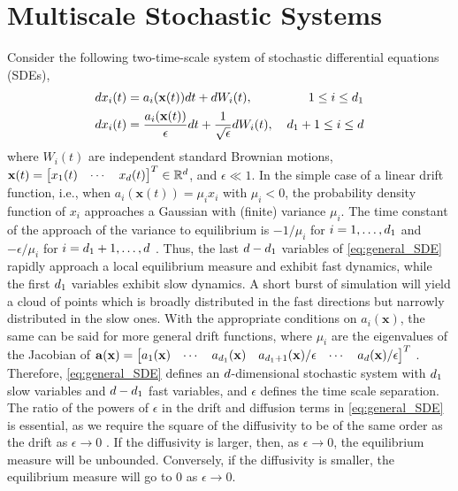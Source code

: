 \section{Multiscale Stochastic Systems} \label{subsec:multiscale_SDE}

Consider the following two-time-scale system of stochastic differential equations (SDEs),
\begin{equation} \label{eq:general_SDE}
\begin{aligned}
dx_i(t) &= a_i(\mathbf{x}(t)) dt + dW_i(t), & \: 1 \le i \le {d_1} \\
dx_i(t) &= \frac{a_i(\mathbf{x}(t))}{\epsilon} dt + \frac{1}{\sqrt{\epsilon}} dW_i(t) , & \: {d_1}+1 \le i \le d
\end{aligned}
\end{equation}
where $W_i(t)$ are independent standard Brownian motions, $\mathbf{x}(t)  =  \allowbreak \begin{bmatrix} x_1(t) & \cdots & x_d(t) \end{bmatrix}^T \allowbreak \in \mathbb{R}^d$, and $\epsilon \ll 1$.
%
In the simple case of a linear drift function, i.e., when $a_i(\mathbf{x}(t)) = \mu _i x_i$ with $\mu_i < 0$, the probability density function of $x_i$ approaches a Gaussian with
(finite) variance $\mu_i$.
%
The time constant of the approach of the variance to equilibrium is $-1/\mu_i$ for $i=1,\ldots,{d_1}$ and $-\epsilon/\mu_i$ for $i={d_1}+1,\ldots,d$ \cite{lelievre2013optimal}.
%
Thus, the last $d-{d_1}$ variables of \eqref{eq:general_SDE} rapidly approach a local equilibrium measure and exhibit fast dynamics, while the first ${d_1}$ variables exhibit slow dynamics.
%
A short burst of simulation will yield a cloud of points which is broadly distributed in the fast directions but narrowly distributed in the slow ones.
%
With the appropriate conditions on $a_i(\mathbf{x})$, the same can be said for more general drift
functions, where $\mu_i$ are the eigenvalues of the Jacobian of $\mathbf{a}(\mathbf{x}) = \begin{bmatrix} a_1(\mathbf{x}) & \cdots & a_{d_1}(\mathbf{x}) & a_{{d_1}+1}(\mathbf{x})/\epsilon & \cdots & a_d(\mathbf{x})/\epsilon \end{bmatrix}^T$ \cite{villani2009hypocoercivity}.
%
Therefore, \eqref{eq:general_SDE} defines an $d$-dimensional stochastic system with ${d_1}$ slow
variables and $d-{d_1}$ fast variables, and $\epsilon$ defines the time scale separation.
%
The ratio of the powers of $\epsilon$ in the drift and diffusion terms in \eqref{eq:general_SDE} is essential,
as we require the square of the diffusivity to be of the same order as the drift as $\epsilon \rightarrow 0$ \cite{berglund2003geometric}.
%
If the diffusivity is larger, then, as $\epsilon \rightarrow 0$, the equilibrium measure will be
unbounded.
%
Conversely, if the diffusivity is smaller, the equilibrium measure will go to $0$ as $\epsilon \rightarrow 0$.

